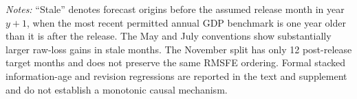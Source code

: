 \begin{table}[htbp]
\centering\scriptsize
\caption{One-month GRE performance before and after the assumed annual-data release month}
\label{tab:staleness}
\vspace{0.35em}
\begin{minipage}{0.97\textwidth}\footnotesize\textit{Notes:} ``Stale'' denotes forecast origins before the assumed release month in year $y+1$, when the most recent permitted annual GDP benchmark is one year older than it is after the release. The May and July conventions show substantially larger raw-loss gains in stale months. The November split has only 12 post-release target months and does not preserve the same RMSFE ordering. Formal stacked information-age and revision regressions are reported in the text and supplement and do not establish a monotonic causal mechanism.\end{minipage}
\end{table}
